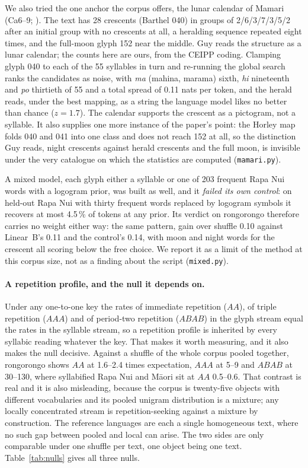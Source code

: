 \documentclass[11pt,a4paper]{article}
\begin{document}
We also tried the one anchor the corpus offers, the lunar calendar of Mamari (Ca6--9; \citealp{guy1990}). The text has 28 crescents (Barthel 040) in groups of 2/6/3/7/3/5/2 after an initial group with no crescents at all, a heralding sequence repeated eight times, and the full-moon glyph 152 near the middle. Guy reads the structure as a lunar calendar; the counts here are ours, from the CEIPP coding. Clamping glyph 040 to each of the 55 syllables in turn and re-running the global search ranks the candidates as noise, with \emph{ma} (mahina, marama) sixth, \emph{hi} nineteenth and \emph{po} thirtieth of 55 and a total spread of 0.11 nats per token, and the herald reads, under the best mapping, as a string the language model likes no better than chance ($z=1.7$). The calendar supports the crescent as a pictogram, not a syllable. It also supplies one more instance of the paper's point: the Horley map folds 040 and 041 into one class and does not reach 152 at all, so the distinction Guy reads, night crescents against herald crescents and the full moon, is invisible under the very catalogue on which the statistics are computed (\texttt{mamari.py}).

A mixed model, each glyph either a syllable or one of 203 frequent Rapa Nui words with a logogram prior, was built as well, and it \emph{failed its own control}: on held-out Rapa Nui with thirty frequent words replaced by logogram symbols it recovers at most 4.5\,\% of tokens at any prior. Its verdict on rongorongo therefore carries no weight either way: the same pattern, gain over shuffle 0.10 against Linear~B's 0.11 and the control's 0.14, with moon and night words for the crescent all scoring below the free choice. We report it as a limit of the method at this corpus size, not as a finding about the script (\texttt{mixed.py}).

\paragraph{A repetition profile, and the null it depends on.} Under any one-to-one key the rates of immediate repetition ($AA$), of triple repetition ($AAA$) and of period-two repetition ($ABAB$) in the glyph stream equal the rates in the syllable stream, so a repetition profile is inherited by every syllabic reading whatever the key. That makes it worth measuring, and it also makes the null decisive. Against a shuffle of the whole corpus pooled together, rongorongo shows $AA$ at 1.6--2.4 times expectation, $AAA$ at 5--9 and $ABAB$ at 30--130, where syllabified Rapa Nui and M\=aori sit at $AA$ 0.5--0.6. That contrast is real and it is also misleading, because the corpus is twenty-five objects with different vocabularies and its pooled unigram distribution is a mixture; any locally concentrated stream is repetition-seeking against a mixture by construction. The reference languages are each a single homogeneous text, where no such gap between pooled and local can arise. The two sides are only comparable under one shuffle per text, one object being one text. Table~\ref{tab:nulls} gives all three nulls.
\end{document}
